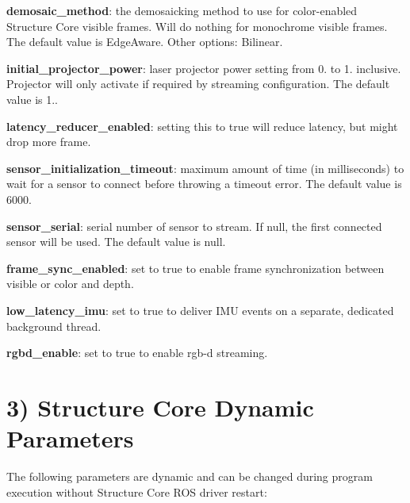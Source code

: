 \begin{DoxyItemize}
\item {\bfseries{demosaic\+\_\+method}}\+: the demosaicking method to use for color-\/enabled Structure Core visible frames. Will do nothing for monochrome visible frames. The default value is Edge\+Aware. Other options\+: Bilinear.
\item {\bfseries{initial\+\_\+projector\+\_\+power}}\+: laser projector power setting from 0. to 1. inclusive. Projector will only activate if required by streaming configuration. The default value is 1..
\item {\bfseries{latency\+\_\+reducer\+\_\+enabled}}\+: setting this to true will reduce latency, but might drop more frame.
\item {\bfseries{sensor\+\_\+initialization\+\_\+timeout}}\+: maximum amount of time (in milliseconds) to wait for a sensor to connect before throwing a timeout error. The default value is 6000.
\item {\bfseries{sensor\+\_\+serial}}\+: serial number of sensor to stream. If null, the first connected sensor will be used. The default value is null.
\item {\bfseries{frame\+\_\+sync\+\_\+enabled}}\+: set to true to enable frame synchronization between visible or color and depth.
\item {\bfseries{low\+\_\+latency\+\_\+imu}}\+: set to true to deliver I\+MU events on a separate, dedicated background thread.
\item {\bfseries{rgbd\+\_\+enable}}\+: set to true to enable rgb-\/d streaming.
\end{DoxyItemize}\hypertarget{ros2_main_features_sc_dynamic_params2}{}\section{3) Structure Core Dynamic Parameters}\label{ros2_main_features_sc_dynamic_params2}
The following parameters are dynamic and can be changed during program execution without Structure Core R\+OS driver restart\+:


